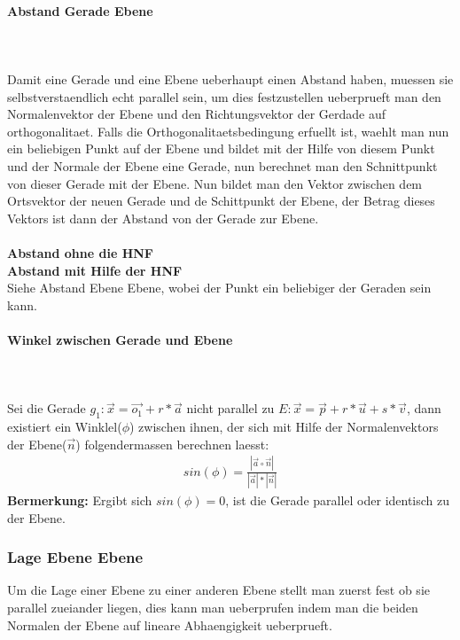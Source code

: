 \documentclass[a4paper]{article} %
\begin{document}
	\paragraph{Abstand Gerade Ebene}
	\hspace{0 cm} \\ \noindent \\
	Damit eine Gerade und eine Ebene ueberhaupt einen Abstand haben, muessen sie selbstverstaendlich echt parallel sein,
	um dies festzustellen ueberprueft man den Normalenvektor der Ebene und den Richtungsvektor der Gerdade auf orthogonalitaet.
	Falls die Orthogonalitaetsbedingung erfuellt ist, waehlt man nun ein beliebigen Punkt auf der Ebene und bildet mit der Hilfe von
	diesem Punkt und der Normale der Ebene eine Gerade, nun berechnet man den Schnittpunkt von dieser Gerade mit der Ebene.
	Nun bildet man den Vektor zwischen dem Ortsvektor der neuen Gerade und de Schittpunkt der Ebene, der Betrag dieses Vektors
	ist dann der Abstand von der Gerade zur Ebene.\\\\
	\textbf{Abstand ohne die HNF}\\
	\textbf{Abstand mit Hilfe der HNF}\\
	Siehe Abstand Ebene Ebene, wobei der Punkt ein beliebiger der Geraden sein kann.
	
	\paragraph{Winkel zwischen Gerade und Ebene}
	\hspace{0 cm} \\ \noindent \\
	Sei die Gerade $g_1: \vec{x}= \vec{o_1}+r*\vec{a}$ nicht parallel zu $E : \vec{x} = \vec{p}+ r*\vec{u}+s*\vec{v}$, dann existiert ein Winklel($\phi$) zwischen ihnen, der sich mit Hilfe der Normalenvektors der Ebene($\vec{n}$) folgendermassen berechnen laesst:
	\begin{align*}
		sin(\phi)= \frac{|\vec{a} \circ \vec{n}|}{|\vec{a}|*|\vec{n}|}
	\end{align*}
	\textbf{Bermerkung:}
	Ergibt sich $sin(\phi)=0$, ist die Gerade parallel oder identisch zu der Ebene.
	\subsubsection{Lage Ebene Ebene}
	Um die Lage einer Ebene zu einer anderen Ebene stellt man zuerst fest ob sie parallel zueiander liegen, dies kann man ueberprufen indem man die beiden Normalen der Ebene auf lineare Abhaengigkeit ueberprueft.
\end{document}
